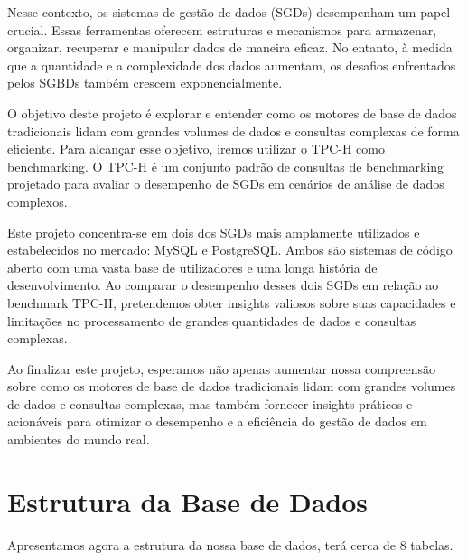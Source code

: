 \documentclass{article}
\begin{document}
\texttt{}\par Nesse contexto, os sistemas de gestão de dados (SGDs) desempenham um papel crucial. Essas ferramentas oferecem estruturas e mecanismos para armazenar, organizar, recuperar e manipular dados de maneira eficaz. No entanto, à medida que a quantidade e a complexidade dos dados aumentam, os desafios enfrentados pelos SGBDs também crescem exponencialmente.\\

\texttt{}\par O objetivo deste projeto é explorar e entender como os motores de base de dados tradicionais lidam com grandes volumes de dados e consultas complexas de forma eficiente. Para alcançar esse objetivo, iremos utilizar o TPC-H como benchmarking. O TPC-H é um conjunto padrão de consultas de benchmarking projetado para avaliar o desempenho de SGDs em cenários de análise de dados complexos.\\

\texttt{}\par Este projeto concentra-se em dois dos SGDs mais amplamente utilizados e estabelecidos no mercado: MySQL e PostgreSQL. Ambos são sistemas de código aberto com uma vasta base de utilizadores e uma longa história de desenvolvimento. Ao comparar o desempenho desses dois SGDs em relação ao benchmark TPC-H, pretendemos obter insights valiosos sobre suas capacidades e limitações no processamento de grandes quantidades de dados e consultas complexas.\\

\texttt{}\par Ao finalizar este projeto, esperamos não apenas aumentar nossa compreensão sobre como os motores de base de dados tradicionais lidam com grandes volumes de dados e consultas complexas, mas também fornecer insights práticos e acionáveis para otimizar o desempenho e a eficiência do gestão de dados em ambientes do mundo real.\\
\clearpage

\section{Estrutura da Base de Dados}
\texttt{}\par Apresentamos agora a estrutura da nossa base de dados, terá cerca de 8 tabelas.\\
\end{document}
